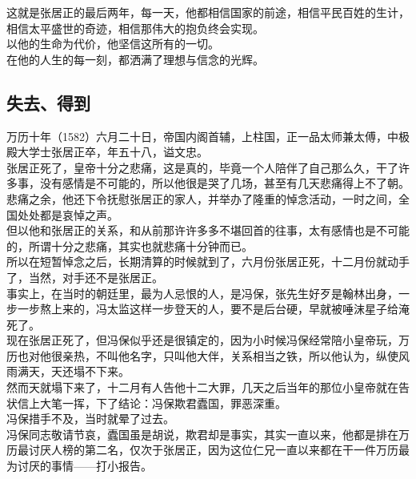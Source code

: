 \begin{multicols}{\theparacolNo}
这就是张居正的最后两年，每一天，他都相信国家的前途，相信平民百姓的生计，相信太平盛世的奇迹，相信那伟大的抱负终会实现。\\

以他的生命为代价，他坚信这所有的一切。\\

在他的人生的每一刻，都洒满了理想与信念的光辉。\\

\subsection{失去、得到}
万历十年（1582）六月二十日，帝国内阁首辅，上柱国，正一品太师兼太傅，中极殿大学士张居正卒，年五十八，谥文忠。\\

张居正死了，皇帝十分之悲痛，这是真的，毕竟一个人陪伴了自己那么久，干了许多事，没有感情是不可能的，所以他很是哭了几场，甚至有几天悲痛得上不了朝。\\

悲痛之余，他还下令抚慰张居正的家人，并举办了隆重的悼念活动，一时之间，全国处处都是哀悼之声。\\

但以他和张居正的关系，和从前那许许多多不堪回首的往事，太有感情也是不可能的，所谓十分之悲痛，其实也就悲痛十分钟而已。\\

所以在短暂悼念之后，长期清算的时候就到了，六月份张居正死，十二月份就动手了，当然，对手还不是张居正。\\

事实上，在当时的朝廷里，最为人忌恨的人，是冯保，张先生好歹是翰林出身，一步一步熬上来的，冯太监这样一步登天的人，要不是后台硬，早就被唾沫星子给淹死了。\\

现在张居正死了，但冯保似乎还是很镇定的，因为小时候冯保经常陪小皇帝玩，万历也对他很亲热，不叫他名字，只叫他大伴，关系相当之铁，所以他认为，纵使风雨满天，天还塌不下来。\\

然而天就塌下来了，十二月有人告他十二大罪，几天之后当年的那位小皇帝就在告状信上大笔一挥，下了结论：冯保欺君蠹国，罪恶深重。\\

冯保措手不及，当时就晕了过去。\\

冯保同志敬请节哀，蠹国虽是胡说，欺君却是事实，其实一直以来，他都是排在万历最讨厌人榜的第二名，仅次于张居正，因为这位仁兄一直以来都在干一件万历最为讨厌的事情——打小报告。\\


\end{multicols}

